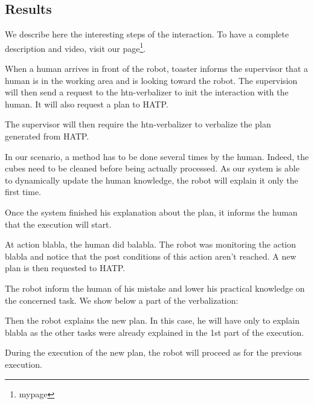\documentclass{llncs}
\begin{document}
\subsection{Results}
\label{results}
We describe here the interesting steps of the interaction. To have a complete description and video, visit our page\footnote{mypage}.

When a human arrives in front of the robot, toaster informs the supervisor that a human is in the working area and is looking toward the robot.
The supervision will then send a request to the htn-verbalizer to init the interaction with the human. It will also request a plan to HATP.

The supervisor will then require the htn-verbalizer to verbalize the plan generated from HATP. %

In our scenario, a method has to be done several times by the human. Indeed, the cubes need to be cleaned before being actually processed.
As our system is able to dynamically update the human knowledge, the robot will explain it only the first time.

Once the system finished his explanation about the plan, it informs the human that the execution will start.

At action blabla, the human did balabla. The robot was monitoring the action blabla and notice that the post conditions of this action aren't reached. A new plan is then requested to HATP.

The robot inform the human of his mistake and lower his practical knowledge on the concerned task.
We show below a part of the verbalization:

Then the robot explains the new plan. In this case, he will have only to explain blabla as the other tasks were already explained in the 1st part of the execution.

During the execution of the new plan, the robot will proceed as for the previous execution.

\end{document}

